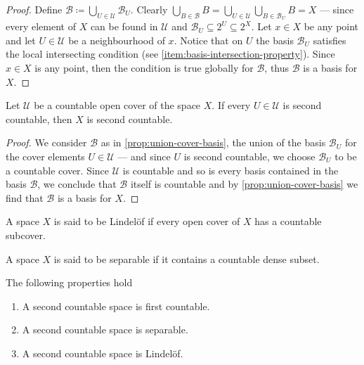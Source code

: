 \begin{proof}
    Define \(\mathcal B \coloneq \bigcup_{U \in \mathcal U} \mathcal B_{U}\).
    Clearly \(\bigcup_{B \in \mathcal B} B = \bigcup_{U \in \mathcal U} \bigcup_{B
        \in \mathcal B_U} B = X\) --- since every element of \(X\) can be found in
    \(\mathcal U\) and \(\mathcal B_U \subseteq 2^U \subseteq 2^{X}\). Let \(x \in
    X\) be any point and let \(U \in \mathcal U\) be a neighbourhood of
    \(x\). Notice that on \(U\) the basis \(\mathcal B_U\) satisfies the local
    intersecting condition (see \cref{item:basis-intersection-property}). Since \(x
    \in X\) is any point, then the condition is true globally for \(\mathcal B\),
    thus \(\mathcal B\) is a basis for \(X\).
\end{proof}

\begin{corollary}
    \label{cor:second-countable-out-of-cover}
    Let \(\mathcal U\) be a countable open cover of the space \(X\). If every \(U
    \in \mathcal U\) is second countable, then \(X\) is second countable.
\end{corollary}

\begin{proof}
    We consider \(\mathcal B\) as in \cref{prop:union-cover-basis}, the union of the
    basis \(\mathcal B_U\) for the cover elements \(U \in \mathcal U\) --- and since
    \(U\) is second countable, we choose \(\mathcal B_U\) to be a countable
    cover. Since \(\mathcal U\) is countable and so is every basis contained in the
    basis \(\mathcal B\), we conclude that \(\mathcal B\) itself is countable and by
    \cref{prop:union-cover-basis} we find that \(\mathcal B\) is a basis for \(X\).
\end{proof}

\begin{definition}
    A space \(X\) is said to be Lindelöf if every open cover of \(X\) has a
    countable subcover.
\end{definition}

\begin{definition}
    A space \(X\) is said to be separable if it contains a countable dense subset.
\end{definition}

\begin{proposition}
    \label{prop: second countable properties}
    The following properties hold
    \begin{enumerate}[(SC1)]
        \item A second countable space is first countable.
        \item A second countable space is separable.
        \item A second countable space is Lindelöf.
    \end{enumerate}
\end{proposition}

